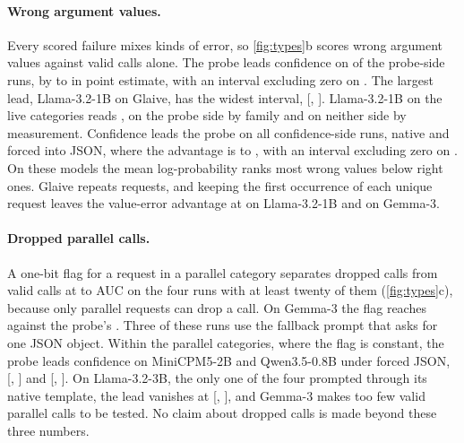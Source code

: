 \paragraph{Wrong argument values.}
Every scored failure mixes kinds of error, so \cref{fig:types}b scores wrong argument values against valid calls alone. The probe leads confidence on \nWavInternalsPos{} of the \nInternalsRuns{} probe-side runs, by \wavInternalsMin{} to \wavInternalsMax{} in point estimate, with an interval excluding zero on \nWavInternalsCiExcl{}. The largest lead, Llama-3.2-1B on Glaive, has the widest interval, [\WavGapLoLlamaOneBGlaive{}, \WavGapHiLlamaOneBGlaive{}]. Llama-3.2-1B on the live categories reads \WavGapLlamaOneBLive{}, on the probe side by family and on neither side by measurement. Confidence leads the probe on all \nWavConfidenceRuns{} confidence-side runs, native and forced into JSON, where the advantage is \wavConfidenceMin{} to \wavConfidenceMax{}, with an interval excluding zero on \nWavConfidenceCiBelow{}. On these models the mean log-probability ranks most wrong values below right ones. Glaive repeats requests, and keeping the first occurrence of each unique request leaves the value-error advantage at \gdWavLlamaOneBGlaive{} on Llama-3.2-1B and \gdWavGemmaGlaive{} on Gemma-3.

\paragraph{Dropped parallel calls.}
A one-bit flag for a request in a parallel category separates dropped calls from valid calls at \catAucMin{} to \catAucMax{} AUC on the four runs with at least twenty of them (\cref{fig:types}c), because only parallel requests can drop a call. On Gemma-3 the flag reaches \catAucGemmaBfcl{} against the probe's \catProbeGemmaBfcl{}. Three of these runs use the fallback prompt that asks for one JSON object. Within the parallel categories, where the flag is constant, the probe leads confidence on MiniCPM5-2B and Qwen3.5-0.8B under forced JSON, \PwGapMiniCpmBfclJson{} [\PwGapLoMiniCpmBfclJson{}, \PwGapHiMiniCpmBfclJson{}] and \PwGapQwenThreeFiveBfclJson{} [\PwGapLoQwenThreeFiveBfclJson{}, \PwGapHiQwenThreeFiveBfclJson{}]. On Llama-3.2-3B, the only one of the four prompted through its native template, the lead vanishes at \PwGapLlamaThreeBBfcl{} [\PwGapLoLlamaThreeBBfcl{}, \PwGapHiLlamaThreeBBfcl{}], and Gemma-3 makes too few valid parallel calls to be tested. No claim about dropped calls is made beyond these three numbers.

